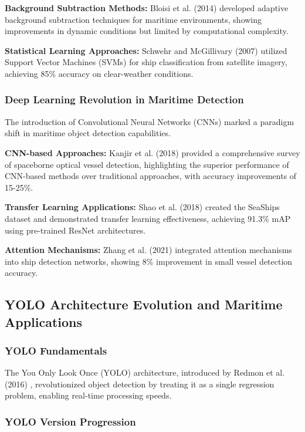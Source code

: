 \documentclass[twoside]{article}
\begin{document}
\begin{multicols}{2}
\textbf{Background Subtraction Methods:} Bloisi et al. (2014) \cite{bloisi2014background} developed adaptive background subtraction techniques for maritime environments, showing improvements in dynamic conditions but limited by computational complexity.

\textbf{Statistical Learning Approaches:} Schwehr and McGillivary (2007) \cite{schwehr2007marine} utilized Support Vector Machines (SVMs) for ship classification from satellite imagery, achieving 85\% accuracy on clear-weather conditions.

\subsubsection{Deep Learning Revolution in Maritime Detection}
The introduction of Convolutional Neural Networks (CNNs) marked a paradigm shift in maritime object detection capabilities.

\textbf{CNN-based Approaches:} Kanjir et al. (2018) \cite{kanjir2018vessel} provided a comprehensive survey of spaceborne optical vessel detection, highlighting the superior performance of CNN-based methods over traditional approaches, with accuracy improvements of 15-25\%.

\textbf{Transfer Learning Applications:} Shao et al. (2018) \cite{shao2018seaships} created the SeaShips dataset and demonstrated transfer learning effectiveness, achieving 91.3\% mAP using pre-trained ResNet architectures.

\textbf{Attention Mechanisms:} Zhang et al. (2021) \cite{zhang2021attention} integrated attention mechanisms into ship detection networks, showing 8\% improvement in small vessel detection accuracy.

\subsection{YOLO Architecture Evolution and Maritime Applications}

\subsubsection{YOLO Fundamentals}
The You Only Look Once (YOLO) architecture, introduced by Redmon et al. (2016) \cite{yolo_original}, revolutionized object detection by treating it as a single regression problem, enabling real-time processing speeds.

\subsubsection{YOLO Version Progression}


\end{multicols}
\end{document}
